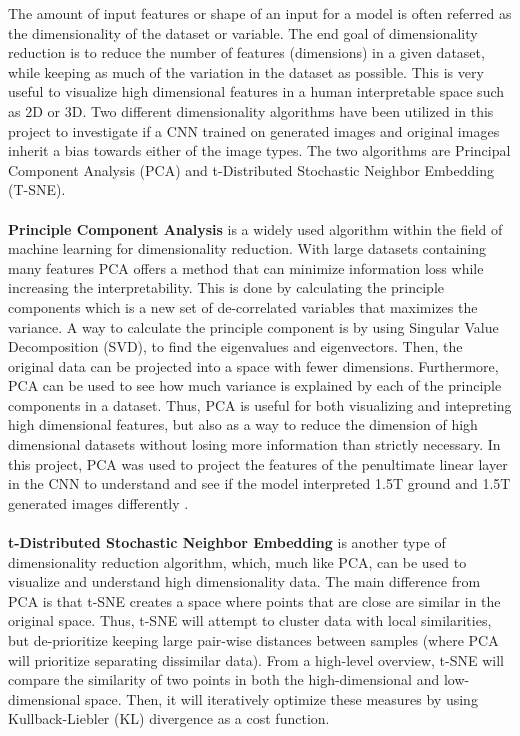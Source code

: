 \documentclass[11pt, fleqn, titlepage]{article}
\newcommand{\1}[1]{\mathds{1}\left[#1\right]}
\begin{document}
The amount of input features or shape of an input for a model is often referred as the dimensionality of the dataset or variable. The end goal of dimensionality reduction is to reduce the number of features (dimensions) in a given dataset, while keeping as much of the variation in the dataset as possible. This is very useful to visualize high dimensional features in a human interpretable space such as 2D or 3D. Two different dimensionality algorithms have been utilized in this project to investigate if a CNN trained on generated images and original images inherit a bias towards either of the image types. The two algorithms are Principal Component Analysis (PCA) and t-Distributed Stochastic Neighbor Embedding (T-SNE).
\\\\
\textbf{Principle Component Analysis} is a widely used algorithm within the field of machine learning for dimensionality reduction. With large datasets containing many features PCA offers a method that can minimize information loss while increasing the interpretability. This is done by calculating the principle components which is a new set of de-correlated variables that maximizes the variance. A way to calculate the principle component is by using Singular Value Decomposition (SVD), to find the eigenvalues and eigenvectors. Then, the original data can be projected into a space with fewer dimensions. Furthermore, PCA can be used to see how much variance is explained by each of the principle components in a dataset. Thus, PCA is useful for both visualizing and intepreting high dimensional features, but also as a way to reduce the dimension of high dimensional datasets without losing more information than strictly necessary. In this project, PCA was used to project the features of the penultimate linear layer in the CNN to understand and see if the model interpreted 1.5T ground and 1.5T generated images differently \cite{pca1} \cite{pca2}. 
\\\\
\textbf{t-Distributed Stochastic Neighbor Embedding} is another type of dimensionality reduction algorithm, which, much like PCA, can be used to visualize and understand high dimensionality data. The main difference from PCA is that t-SNE  creates a space where points that are close are similar in the original space. Thus, t-SNE will attempt to cluster data with local similarities, but de-prioritize keeping large pair-wise distances between samples (where PCA will prioritize separating dissimilar data). 
From a high-level overview, t-SNE will compare the similarity of two points in both the high-dimensional and low-dimensional space. Then, it will iteratively optimize these measures by using Kullback-Liebler (KL) divergence as a cost function.
\end{document}
